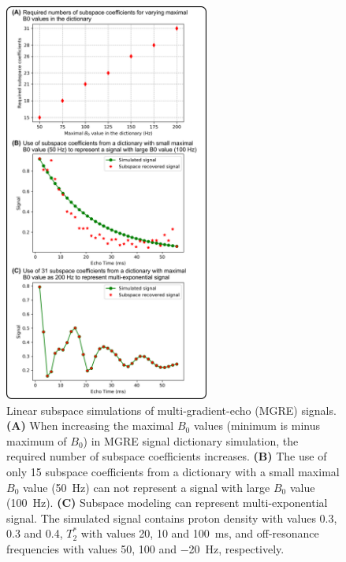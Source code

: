 \documentclass[a4paper,11pt]{article}
\def\InternRev{}
\begin{document}
\begin{figure}[H]
	\centering
\ifdefined\InternRev
	\includegraphics[width=0.6\textwidth]{../figures/fig1.png}
\fi
	\caption{Linear subspace simulations of multi-gradient-echo (MGRE) signals.
	\textbf{(A)} When increasing the maximal $B_0$ values 
	(minimum is minus maximum of $B_0$)
	in MGRE signal dictionary simulation,
	the required number of subspace coefficients increases.
	\textbf{(B)} The use of only 15 subspace coefficients from a dictionary 
	with a small maximal $B_0$ value (\SI{50}{Hz}) can not represent a signal 
	with large $B_0$ value (\SI{100}{Hz}).
	\textbf{(C)} Subspace modeling can represent multi-exponential signal. 
	The simulated signal contains 
	proton density with values \num{0.3}, \num{0.3} and \num{0.4}, 
	$T_2^*$ with values \num{20}, \num{10} and \num{100}~\si{\ms}, and 
	off-resonance frequencies with values \num{50}, \num{100} and \num{-20}~\si{\Hz}, 
	respectively.}
	\label{FIG:SubspaceSim}
\end{figure}

\ifdefined\InternRev
\pagebreak
\fi
\end{document}
